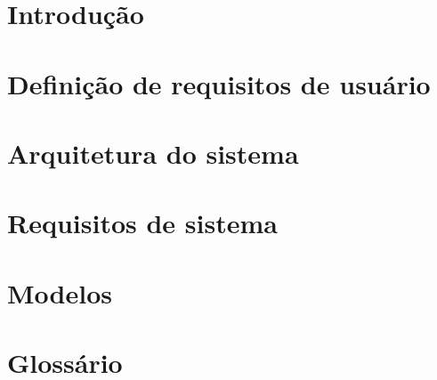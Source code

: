 \documentclass[11pt, a4paper]{article}
\let\oldsection\section
\renewcommand{\section}{\leftskip=0.0cm\oldsection}
\begin{document}


\tableofcontents
\pagebreak

\section{Introdução}



\section{Definição de requisitos de usuário}

\section{Arquitetura do sistema}

\section{Requisitos de sistema}

\section{Modelos}


\section{Glossário}
\end{document}
